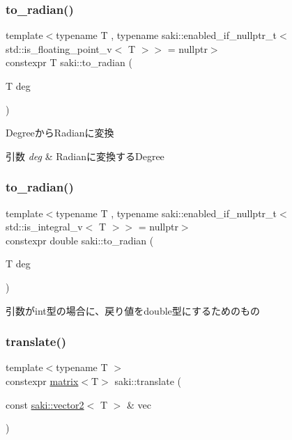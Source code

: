 \subsubsection{\texorpdfstring{to\+\_\+radian()}{to\_radian()}\hspace{0.1cm}{\footnotesize\ttfamily [1/2]}}
{\footnotesize\ttfamily template$<$typename T , typename saki\+::enabled\+\_\+if\+\_\+nullptr\+\_\+t$<$ std\+::is\+\_\+floating\+\_\+point\+\_\+v$<$ T $>$$>$  = nullptr$>$ \\
constexpr T saki\+::to\+\_\+radian (\begin{DoxyParamCaption}\item[{T}]{deg }\end{DoxyParamCaption})}



Degreeから\+Radianに変換 


\begin{DoxyParams}{引数}
{\em deg} & Radianに変換する\+Degree \\
\hline
\end{DoxyParams}
\mbox{\label{namespacesaki_aa671d122197cf10439eee0d271f51fe6}} 
\subsubsection{\texorpdfstring{to\+\_\+radian()}{to\_radian()}\hspace{0.1cm}{\footnotesize\ttfamily [2/2]}}
{\footnotesize\ttfamily template$<$typename T , typename saki\+::enabled\+\_\+if\+\_\+nullptr\+\_\+t$<$ std\+::is\+\_\+integral\+\_\+v$<$ T $>$$>$  = nullptr$>$ \\
constexpr double saki\+::to\+\_\+radian (\begin{DoxyParamCaption}\item[{T}]{deg }\end{DoxyParamCaption})}



引数がint型の場合に、戻り値をdouble型にするためのもの 

\mbox{\label{namespacesaki_a2311e77a2bed9d914a6b3e8056d6023a}} 
\subsubsection{\texorpdfstring{translate()}{translate()}\hspace{0.1cm}{\footnotesize\ttfamily [1/3]}}
{\footnotesize\ttfamily template$<$typename T $>$ \\
constexpr \mbox{\hyperlink{classsaki_1_1matrix}{matrix}}$<$T$>$ saki\+::translate (\begin{DoxyParamCaption}\item[{const \mbox{\hyperlink{classsaki_1_1vector2}{saki\+::vector2}}$<$ T $>$ \&}]{vec }\end{DoxyParamCaption})}




